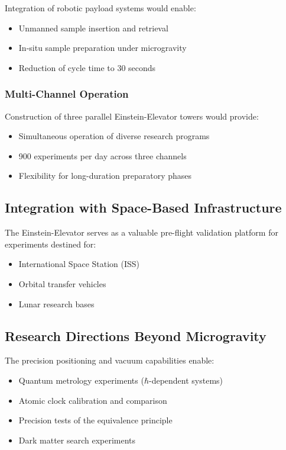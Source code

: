 ﻿\documentclass[a4paper,12pt]{article}
\theoremstyle{definition}
\begin{document}
Integration of robotic payload systems would enable:
\begin{itemize}
	\item Unmanned sample insertion and retrieval
	\item In-situ sample preparation under microgravity
	\item Reduction of cycle time to 30 seconds
\end{itemize}

\subsubsection{Multi-Channel Operation}

Construction of three parallel Einstein-Elevator towers would provide:
\begin{itemize}
	\item Simultaneous operation of diverse research programs
	\item 900 experiments per day across three channels
	\item Flexibility for long-duration preparatory phases
\end{itemize}

\subsection{Integration with Space-Based Infrastructure}

The Einstein-Elevator serves as a valuable pre-flight validation platform for experiments destined for:
\begin{itemize}
	\item International Space Station (ISS)
	\item Orbital transfer vehicles
	\item Lunar research bases
\end{itemize}

\subsection{Research Directions Beyond Microgravity}

The precision positioning and vacuum capabilities enable:
\begin{itemize}
	\item Quantum metrology experiments ($\hbar$-dependent systems)
	\item Atomic clock calibration and comparison
	\item Precision tests of the equivalence principle
	\item Dark matter search experiments
\end{itemize}
\end{document}
